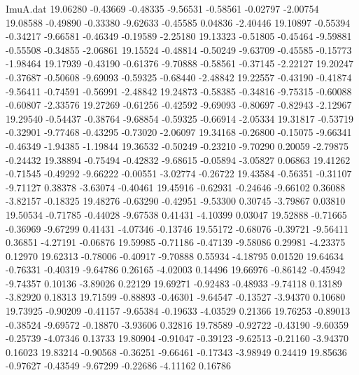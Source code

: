 \begin{filecontents}{ImuA.dat}
  19.06280   -0.43669   -0.48335   -9.56531   -0.58561   -0.02797   -2.00754
  19.08588   -0.49890   -0.33380   -9.62633   -0.45585    0.04836   -2.40446
  19.10897   -0.55394   -0.34217   -9.66581   -0.46349   -0.19589   -2.25180
  19.13323   -0.51805   -0.45464   -9.59881   -0.55508   -0.34855   -2.06861
  19.15524   -0.48814   -0.50249   -9.63709   -0.45585   -0.15773   -1.98464
  19.17939   -0.43190   -0.61376   -9.70888   -0.58561   -0.37145   -2.22127
  19.20247   -0.37687   -0.50608   -9.69093   -0.59325   -0.68440   -2.48842
  19.22557   -0.43190   -0.41874   -9.56411   -0.74591   -0.56991   -2.48842
  19.24873   -0.58385   -0.34816   -9.75315   -0.60088   -0.60807   -2.33576
  19.27269   -0.61256   -0.42592   -9.69093   -0.80697   -0.82943   -2.12967
  19.29540   -0.54437   -0.38764   -9.68854   -0.59325   -0.66914   -2.05334
  19.31817   -0.53719   -0.32901   -9.77468   -0.43295   -0.73020   -2.06097
  19.34168   -0.26800   -0.15075   -9.66341   -0.46349   -1.94385   -1.19844
  19.36532   -0.50249   -0.23210   -9.70290    0.20059   -2.79875   -0.24432
  19.38894   -0.75494   -0.42832   -9.68615   -0.05894   -3.05827    0.06863
  19.41262   -0.71545   -0.49292   -9.66222   -0.00551   -3.02774   -0.26722
  19.43584   -0.56351   -0.31107   -9.71127    0.38378   -3.63074   -0.40461
  19.45916   -0.62931   -0.24646   -9.66102    0.36088   -3.82157   -0.18325
  19.48276   -0.63290   -0.42951   -9.53300    0.30745   -3.79867    0.03810
  19.50534   -0.71785   -0.44028   -9.67538    0.41431   -4.10399    0.03047
  19.52888   -0.71665   -0.36969   -9.67299    0.41431   -4.07346   -0.13746
  19.55172   -0.68076   -0.39721   -9.56411    0.36851   -4.27191   -0.06876
  19.59985   -0.71186   -0.47139   -9.58086    0.29981   -4.23375    0.12970
  19.62313   -0.78006   -0.40917   -9.70888    0.55934   -4.18795    0.01520
  19.64634   -0.76331   -0.40319   -9.64786    0.26165   -4.02003    0.14496
  19.66976   -0.86142   -0.45942   -9.74357    0.10136   -3.89026    0.22129
  19.69271   -0.92483   -0.48933   -9.74118    0.13189   -3.82920    0.18313
  19.71599   -0.88893   -0.46301   -9.64547   -0.13527   -3.94370    0.10680
  19.73925   -0.90209   -0.41157   -9.65384   -0.19633   -4.03529    0.21366
  19.76253   -0.89013   -0.38524   -9.69572   -0.18870   -3.93606    0.32816
  19.78589   -0.92722   -0.43190   -9.60359   -0.25739   -4.07346    0.13733
  19.80904   -0.91047   -0.39123   -9.62513   -0.21160   -3.94370    0.16023
  19.83214   -0.90568   -0.36251   -9.66461   -0.17343   -3.98949    0.24419
  19.85636   -0.97627   -0.43549   -9.67299   -0.22686   -4.11162    0.16786

\end{filecontents}
